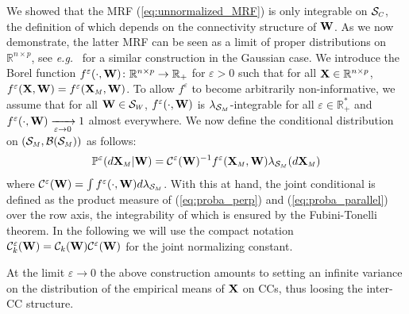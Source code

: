 We showed that the MRF (\ref{eq:unnormalized_MRF}) is only integrable on $\mathcal{S}_{\scaleto{C}{4pt}}$, the  definition of which depends on the connectivity structure of $\mathbf{W}$. As we now demonstrate, the latter MRF can be seen as a limit of proper distributions on $\mathbb{R}^{n \times p}$, see \textit{e.g.}\ \cite{rue2005gaussian} for a similar construction in the Gaussian case. 
We introduce the Borel function $f^{\varepsilon}(\cdot, \mathbf{W}) \colon \mathbb{R}^{n \times p} \to \mathbb{R}_+$ for $\varepsilon > 0$ such that for all $\mathbf{X} \in \mathbb{R}^{n \times p}$, $f^{\varepsilon}(\X, \W) = f^{\varepsilon}(\X_{\scaleto{M}{4pt}}, \W)$. To allow $f^{\varepsilon}$ to become arbitrarily non-informative, we assume that for all $\W \in \mathcal{S}_{\scaleto{W}{4pt}}$, $f^\varepsilon(\cdot, \mathbf{W})$ is $\lambda_{\scaleto{\mathcal{S}_{\scaleto{M}{3pt}}}{6pt}}$-integrable for all $\varepsilon \in \mathbb{R}^*_+$ and $f^{\varepsilon}(\cdot, \mathbf{W}) \xrightarrow[\varepsilon \to 0]{} 1$ almost everywhere.
We now define the conditional distribution on $(\mathcal{S}_{\scaleto{M}{4pt}}, \mathcal{B}(\mathcal{S}_{\scaleto{M}{4pt}}))$ as follows:
\begin{align}\label{eq:proba_parallel}
     \mathbb{P}^{\varepsilon}(d\X_{\scaleto{M}{4pt}}| \W) = \mathcal{C}^{\varepsilon}(\W)^{-1} f^{\varepsilon}(\X_{\scaleto{M}{4pt}}, \W) \lambda_{\mathcal{S}_{\scaleto{M}{3pt}}}(d\X_{\scaleto{M}{4pt}})
\end{align}
where $\mathcal{C}^{\varepsilon}(\W) = \int f^{\varepsilon}(\cdot, \W) d\lambda_{\mathcal{S}_{\scaleto{M}{3pt}}}$.
With this at hand, the joint conditional is defined as the product measure of (\ref{eq:proba_perp}) and (\ref{eq:proba_parallel}) over the row axis, the integrability of which is ensured by the Fubini-Tonelli theorem. In the following we will use the compact notation $\mathcal{C}^{\varepsilon}_k(\mathbf{W}) = \mathcal{C}_k(\mathbf{W})\mathcal{C}^{\varepsilon}(\mathbf{W})$ for the joint normalizing constant.

\begin{remark}
At the limit $\varepsilon \to 0$ the above construction amounts to setting an infinite variance on the distribution of the empirical means of $\mathbf{X}$ on CCs, thus loosing the inter-CC structure. 
\end{remark}

